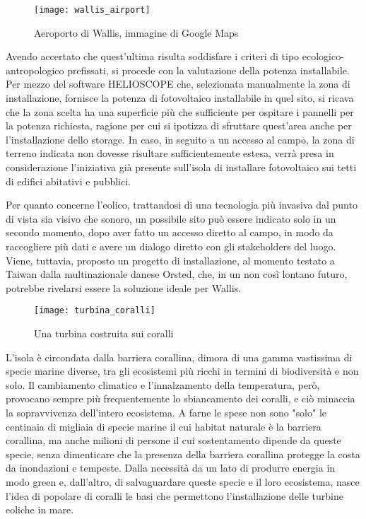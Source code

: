 \documentclass[fleqn,11pt]{SelfArx} %
\begin{document}
\begin{figure}[ht]\centering
	\texttt{[image: wallis\_airport]}
	\caption{Aeroporto di Wallis, immagine di Google Maps}
	\label{fig:wallis_airport}
\end{figure}

Avendo accertato che quest'ultima risulta soddisfare i criteri di tipo ecologico-antropologico prefissati, si procede con la valutazione della potenza installabile. 
Per mezzo del software HELIOSCOPE che, selezionata manualmente la zona di installazione, fornisce la potenza di fotovoltaico installabile in quel sito, si ricava che la zona scelta ha una superficie più che sufficiente per ospitare i pannelli per la potenza richiesta, ragione per cui si ipotizza di sfruttare quest'area anche per l'installazione dello storage.
In caso, in seguito a un accesso al campo, la zona di terreno indicata non dovesse risultare sufficientemente estesa, verrà presa in considerazione l'iniziativa già presente sull'isola di installare fotovoltaico sui tetti di edifici abitativi e pubblici.

Per quanto concerne l'eolico, trattandosi di una tecnologia più invasiva dal punto di vista sia visivo che sonoro, un possibile sito può essere indicato solo in un secondo momento, dopo aver fatto un accesso diretto al campo, in modo da raccogliere più dati e avere un dialogo diretto con gli stakeholders del luogo. 
Viene, tuttavia, proposto un progetto di installazione, al momento testato a Taiwan dalla multinazionale danese Orsted, che, in un non così lontano futuro, potrebbe rivelarsi essere la soluzione ideale per Wallis. \cite{ORS:Coral}

\begin{figure}[ht]\centering
	\texttt{[image: turbina\_coralli]}
	\caption{Una turbina costruita sui coralli}
	\label{fig:coralli}
\end{figure}

L'isola è circondata dalla barriera corallina, dimora di una gamma vastissima di specie marine diverse, tra gli ecosistemi più ricchi in termini di biodiversità e non solo.
Il cambiamento climatico e l'innalzamento della temperatura, però, provocano sempre più frequentemente lo sbiancamento dei coralli, e ciò minaccia la sopravvivenza dell'intero ecosistema. 
A farne le spese non sono "solo" le centinaia di migliaia di specie marine il cui habitat naturale è la barriera corallina, ma anche milioni di persone il cui sostentamento dipende da queste specie, senza dimenticare che la presenza della barriera corallina protegge la costa da inondazioni e tempeste. 
Dalla necessità da un lato di produrre energia in modo green e, dall'altro, di salvaguardare queste specie e il loro ecosistema, nasce l'idea di popolare di coralli le basi che permettono l'installazione delle turbine eoliche in mare.
\end{document}
